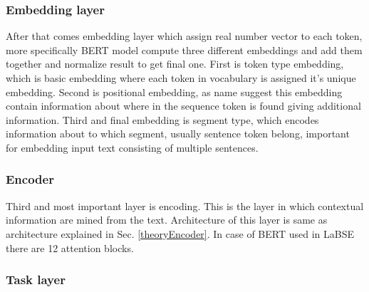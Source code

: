 \subsubsection{Embedding layer}

After that comes embedding layer which assign real number vector to each token, more specifically BERT model compute three different embeddings and add them together and normalize result to get final one. First is token type embedding, which is basic embedding where each token in vocabulary is assigned it's unique embedding. Second is positional embedding, as name suggest this embedding contain information about where in the sequence token is found giving additional information. Third and final embedding is segment type, which encodes information about to which segment, usually sentence token belong, important for embedding input text consisting of multiple sentences.

\subsubsection{Encoder}

Third and most important layer is encoding. This is the layer in which contextual information are mined from the text. Architecture of this layer is same as architecture explained in Sec. \ref{theoryEncoder}. In case of BERT used in LaBSE there are 12 attention blocks. 

\subsubsection{Task layer}

